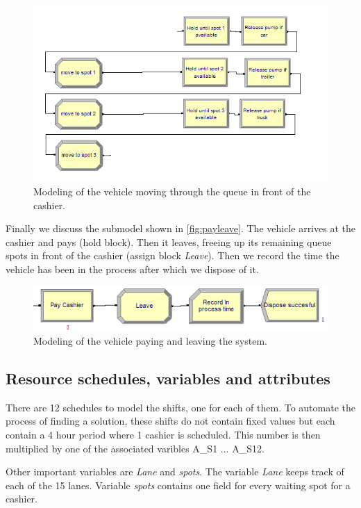 \begin{figure}[h]
\begin{center}
	\includegraphics[scale=1]{images/model-description/cashier-queue.PNG}
	\caption{Modeling of the vehicle moving through the queue in front of the cashier.}
	\label{fig:cashierqueue}
\end{center}
\end{figure}

Finally we discuss the submodel shown in \autoref{fig:payleave}.
 The vehicle arrives at the cashier and pays (hold block). 
 Then it leaves, freeing up its remaining queue spots in front of the cashier (assign block \textit{Leave}).
 Then we record the time the vehicle has been in the process after which we dispose of it.

\begin{figure}[h]
\begin{center}
	\includegraphics[scale=1]{images/model-description/pay-and-leave.PNG}
	\caption{Modeling of the vehicle paying and leaving the system.}
	\label{fig:payleave}
\end{center}
\end{figure}

\subsection{Resource schedules, variables and attributes}\label{app:resources}
There are 12 schedules to model the shifts, one for each of them.
To automate the process of finding a solution, these shifts do not contain fixed values but each contain a 4 hour period where 1 cashier is scheduled.
This number is then multiplied by one of the associated varibles A\_S1 $\ldots$ A\_S12.

Other important variables are \textit{Lane} and \textit{spots}.
The variable \textit{Lane} keeps track of each of the 15 lanes.
Variable \textit{spots} contains one field for every waiting spot for a cashier. 
